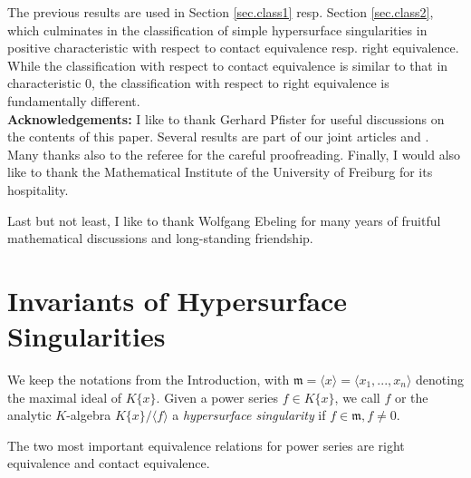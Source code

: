 \documentclass[11pt]{article}
\def\x{\langle x \rangle}
\newcommand{\fm}{\mathfrak{m}}
\begin{document}
The previous results are used  in Section \ref{sec.class1} resp. Section \ref{sec.class2}, which culminates in the classification of simple hypersurface singularities in positive characteristic with respect to contact equivalence resp. right equivalence. While the classification with respect to contact equivalence is similar to that in characteristic 0, the classification with respect to right equivalence is fundamentally different.\\

{\bf Acknowledgements:} I like to thank Gerhard Pfister for useful discussions on the contents of this paper. Several results are part of our joint articles \cite{GP25} and \cite{GP25a}.  {Many thanks also to the referee for the careful proofreading.}
Finally, I would also like to thank the Mathematical Institute of the University of Freiburg for its hospitality. 

 {Last but not least, I like to thank Wolfgang Ebeling for many years of fruitful mathematical discussions and long-standing friendship.}

\section{Invariants of Hypersurface Singularities}\label{sec.invariants}
We keep the notations from the Introduction, with $\fm =\x =\langle x_1,...,x_n\rangle$ denoting the maximal ideal of $K\{x\}$.
Given a power series $f\in  K\{x\}$, we  call $f$ or the analytic $K$-algebra
$K\{x\}/\langle f\rangle$
a \emph{hypersurface singularity} if $f \in \fm, f\ne 0$.

The two most important equivalence relations for power series are right equivalence and contact equivalence.
\end{document}
